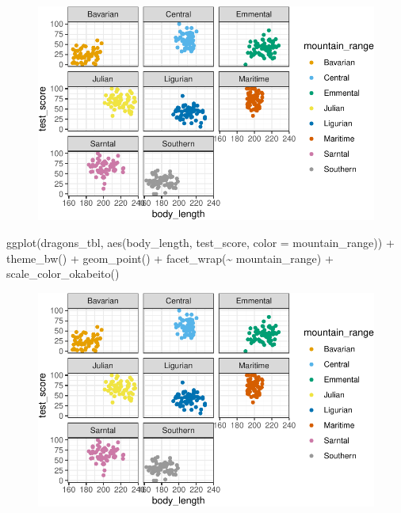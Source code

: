 \documentclass[
  letterpaper,
]{scrbook}
\newenvironment{Shaded}{\begin{snugshade}}{\end{snugshade}}
\newcommand{\AttributeTok}[1]{\textcolor[rgb]{0.40,0.45,0.13}{#1}}
\newcommand{\FunctionTok}[1]{\textcolor[rgb]{0.28,0.35,0.67}{#1}}
\newcommand{\NormalTok}[1]{\textcolor[rgb]{0.00,0.23,0.31}{#1}}
\newcommand{\SpecialCharTok}[1]{\textcolor[rgb]{0.37,0.37,0.37}{#1}}
\begin{document}
\begin{figure}[H]

{\centering \includegraphics{./stat-modeling-mixed_files/figure-pdf/unnamed-chunk-11-1.pdf}

}

\end{figure}

\begin{Shaded}
\begin{Highlighting}[]
\FunctionTok{ggplot}\NormalTok{(dragons\_tbl, }\FunctionTok{aes}\NormalTok{(body\_length, test\_score, }\AttributeTok{color =}\NormalTok{ mountain\_range)) }\SpecialCharTok{+} 
  \FunctionTok{theme\_bw}\NormalTok{() }\SpecialCharTok{+}
  \FunctionTok{geom\_point}\NormalTok{() }\SpecialCharTok{+} 
  \FunctionTok{facet\_wrap}\NormalTok{(}\SpecialCharTok{\textasciitilde{}}\NormalTok{ mountain\_range) }\SpecialCharTok{+}
  \FunctionTok{scale\_color\_okabeito}\NormalTok{()}
\end{Highlighting}
\end{Shaded}

\begin{figure}[H]

{\centering \includegraphics{./stat-modeling-mixed_files/figure-pdf/unnamed-chunk-12-1.pdf}

}

\end{figure}
\end{document}
